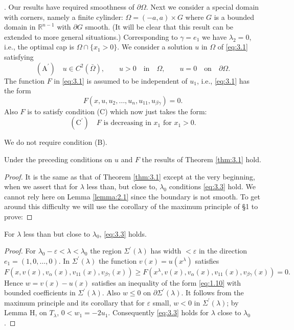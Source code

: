 . Our results have required smoothness of $\partial\Omega$. 
Next we consider a special domain with corners, namely a finite cylinder:
$\Omega=(-a, a)\times G$ where $G$ is a bounded domain in $\mathbb{R}^{n-1}$ 
with $\partial G$ smooth. (It will be clear that this result can be extended 
to more general situations.) Corresponding to $\gamma = e_1$ we have $\lambda_2 =0$,
i.e., the optimal cap is $\Omega\cap\{x_1 >0\}$. We consider a solution $u$ in 
$\Omega$ of \eqref{eq:3.1} satisfying
\[\mathrm{(A^{\prime})}\quad u\in C^2(\bar{\Omega}), \qquad u>0 \quad \text{in}\quad\Omega,\qquad u=0\quad\text{on}\quad\partial\Omega.\]
The function $F$ in \eqref{eq:3.1} is assumed to be independent of $u_1$, i.e., \eqref{eq:3.1} has the form
\[ F(x, u, u_2,\ldots,u_n, u_{11}, u_{\beta\gamma}) = 0. \]
Also $F$ is to satisfy condition (C) which now just takes the form:
\[\mathrm{(C^{\prime})}\quad \text{$F$ is decreasing in $x_1$ for $x_1 >0$.} \]

We do not require condition (B).

\begin{theorem}\label{thm:3.2}
  Under the preceding conditions on $u$ and $F$ the results of Theorem \ref{thm:3.1} hold.
\end{theorem}

\begin{proof}
  It is the same as that of Theorem \ref{thm:3.1} except at the very beginning, when we assert that for $\lambda$ less than, but close to, $\lambda_0$ conditions \eqref{eq:3.3} hold. We cannot rely here on Lemma \ref{lemma:2.1} since the boundary is not smooth. To get around this difficulty we will use the corollary of the maximum principle of \S 1 to prove:
\end{proof}

\begin{lemma}\label{lem:3.1}
  For $\lambda$ less than but close to $\lambda_0$, \eqref{eq:3.3} holds.
\end{lemma}

\begin{proof}
  For $\lambda_0-\varepsilon<\lambda<\lambda_0$ the region $\Sigma^{\prime}(\lambda)$ has width $<\varepsilon$ in the direction $e_1 =(1,0,\ldots,0)$. In $\Sigma^{\prime}(\lambda)$ the function $v(x)=u(x^{\lambda})$ satisfies
  \[ F(x, v(x), v_{\alpha}(x), v_{11}(x), v_{\beta\gamma}(x) ) \geq  F(x^{\lambda}, v(x), v_{\alpha}(x), v_{11}(x), v_{\beta\gamma}(x) ) =0. \]
  Hence $w=v(x)-u(x)$ satisfies an inequality of the form \eqref{eq:1.10} with bounded 
  coefficients in $\Sigma^{\prime}(\lambda)$. Also $w \leq  0$ 
  on $\partial\Sigma^{\prime}(\lambda)$. 
  It follows from the maximum principle and its corollary that for $\varepsilon$ small, 
  $w<0$ in $\Sigma^{\prime}(\lambda)$; by Lemma H, on $T_{\lambda}$, 
  $0<w_1 = -2u_1$. Consequently \eqref{eq:3.3} holds for $\lambda$ close to $\lambda_0$.
\end{proof}

